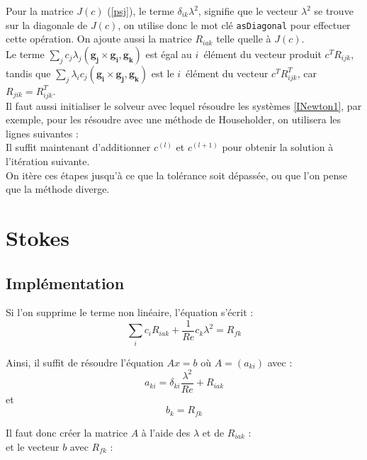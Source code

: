 Pour la matrice $J(c)$ (\ref{psj}), le terme $\delta_{ik}\lambda^2$, signifie que le vecteur $\lambda^2$ se trouve sur la diagonale de $J(c)$, on utilise donc le mot clé \texttt{asDiagonal} pour effectuer cette opération. On ajoute aussi la matrice $R_{iak}$ telle quelle à $J(c)$.\\
Le terme $\sum_j c_j\lambda_j (\mathbf{g_j}\times\mathbf{g_i},\mathbf{g_k})$ est égal au $i$\ieme\ élément du vecteur produit $c^TR_{ijk}$, tandis que $\sum_j\lambda_i c_j (\mathbf{g_i}\times\mathbf{g_j},\mathbf{g_k})$ est le $i$\ieme\ élément du vecteur $c^TR_{ijk}^T$, car $R_{jik}=R_{ijk}^T$.\\


Il faut aussi initialiser le solveur avec lequel résoudre les systèmes \ref{INewton1}, par exemple, pour les résoudre avec une méthode de Householder, on utilisera les lignes suivantes :\\


Il suffit maintenant d'additionner $c^{(l)}$ et $c^{(l+1)}$ pour obtenir la solution à l'itération suivante.\\


On itère ces étapes jusqu'à ce que la tolérance soit dépassée, ou que l'on pense que la méthode diverge.

\section{Stokes}
\subsection{Implémentation}
Si l'on supprime le terme non linéaire, l'équation s'écrit :
\[ \sum_i c_iR_{iak} +\frac{1}{Re}c_k\lambda^2 = R_{fk} \]

Ainsi, il suffit de résoudre l'équation $Ax=b$ où $A=(a_{ki})$ avec :
\[ a_{ki} = \delta_{ki}\frac{\lambda^2}{Re} + R_{iak} \]
et
\[ b_k = R_{fk} \]

Il faut donc créer la matrice $A$ à l'aide des $\lambda$ et de $R_{iak}$ :\\

et le vecteur $b$ avec $R_{fk}$ :\\



